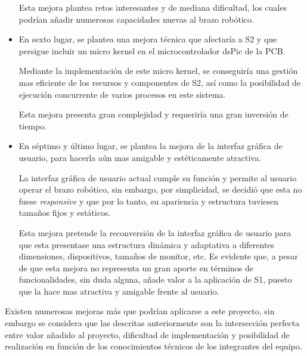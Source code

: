 \begin{itemize}
    Esta mejora plantea retos interesantes y de mediana dificultad, los cuales podrían añadir numerosas capacidades nuevas al brazo robótico.
    
    \item En sexto lugar, se plantea una mejora técnica que afectaría a \ac{S2} y que persigue incluir un micro kernel en el microcontrolador dsPic de la PCB.
    
    Mediante la implementación de este micro kernel, se conseguiría una gestión mas eficiente de los recursos y componentes de \ac{S2}, así como la posibilidad de ejecución concurrente de varios procesos en este sistema.
    
    Esta mejora presenta gran complejidad y requeriría una gran inversión de tiempo.
    
    \item En séptimo y último lugar, se plantea la mejora de la interfaz gráfica de usuario, para hacerla aún mas amigable y estéticamente atractiva.
    
    La interfaz gráfica de usuario actual cumple su función y permite al usuario operar el brazo robótico, sin embargo, por simplicidad, se decidió que esta no fuese \textit{responsive} y que por lo tanto, su apariencia y estructura tuviesen tamaños fijos y estáticos.
    
    Esta mejora pretende la reconversión de la interfaz gráfica de usuario para que esta presentase una estructura dinámica y adaptativa a diferentes dimensiones, dispositivos, tamaños de monitor, etc. Es evidente que, a pesar de que esta mejora no representa un gran aporte en términos de funcionalidades, sin duda alguna, añade valor a la aplicación de \ac{S1}, puesto que la hace mas atractiva y amigable frente al usuario.

\end{itemize}

Existen numerosas mejoras más que podrían aplicarse a este proyecto, sin embargo se considera que las descritas anteriormente son la intersección perfecta entre valor añadido al proyecto, dificultad de implementación y posibilidad de realización en función de los conocimientos técnicos de los integrantes del equipo.